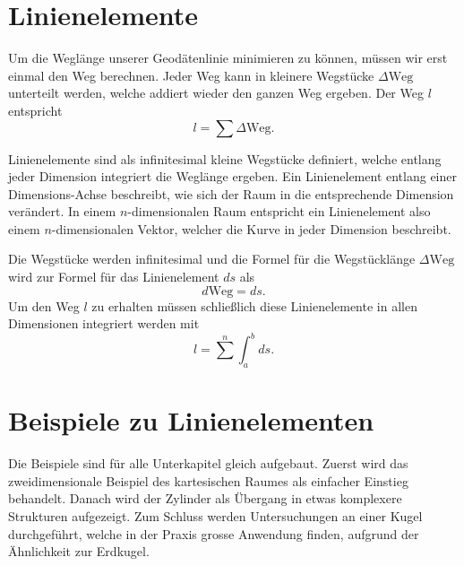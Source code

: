 %
%
%
%
\section{Linienelemente\label{geodaeten:section:Linienelemente}}

Um die Weglänge unserer Geodätenlinie minimieren zu können, müssen wir erst einmal den Weg berechnen.
Jeder Weg kann in kleinere Wegstücke $\Delta \text{Weg}$ unterteilt werden, welche addiert wieder den ganzen Weg ergeben.
Der Weg $l$ entspricht 
\begin{equation}
	l = \sum \Delta \text{Weg} .
\end{equation}

Linienelemente sind als infinitesimal kleine Wegstücke definiert, welche entlang jeder Dimension integriert die Weglänge ergeben.
Ein Linienelement entlang einer Dimensions-Achse beschreibt, wie sich der Raum in die entsprechende Dimension verändert.
In einem $n$-dimensionalen Raum entspricht ein Linienelement also einem $n$-dimensionalen Vektor, welcher die Kurve in jeder Dimension beschreibt.

Die Wegstücke werden infinitesimal und die Formel für die Wegstücklänge $\Delta \text{Weg}$ wird zur Formel für das Linienelement $ds$  als
\begin{equation}	
	d\text{Weg} = ds .
	\label{geodaeten:equation:Linienelemente:equation1}
\end{equation}
Um den Weg $l$ zu erhalten müssen schließlich diese Linienelemente in allen Dimensionen integriert werden mit
\begin{equation}
	l = 
	\sum^{n} \int_a^b ds .
	\label{geodaeten:equation:Linienelemente:equation2}
\end{equation}

\section{Beispiele zu Linienelementen\label{geodaeten:section:Linienelemente:Beispiele}}
Die Beispiele sind für alle Unterkapitel gleich aufgebaut.
Zuerst wird das zweidimensionale Beispiel des kartesischen Raumes als einfacher Einstieg behandelt.
Danach wird der Zylinder als Übergang in etwas komplexere Strukturen aufgezeigt.
Zum Schluss werden Untersuchungen an einer Kugel durchgeführt, welche in der Praxis grosse Anwendung finden, aufgrund der Ähnlichkeit zur Erdkugel.

	
	
	

